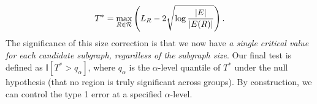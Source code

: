 {\begin{align} \label{eq:scanstat}
T^\ast=\max_{R\in\mathcal{R}}\left(L_R-2\sqrt{\log\frac{|E|}{ |E(R)|}}\right).
\end{align}}
The significance of this size correction is that we now have \textit{a single critical value for each candidate subgraph, regardless of the subgraph size}. Our final test is defined as $\mathbb{I}[T^* > q_\alpha]$, where $q_\alpha$ is the $\alpha$-level quantile of $T^*$ under the null hypothesis (that no region is truly significant across groups). By construction, we can control the type 1 error at a specified $\alpha$-level.

